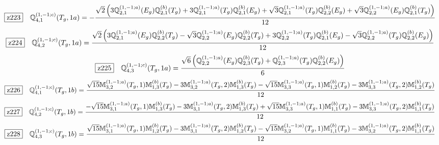 \documentclass[fleqn,10pt,landscape]{jsarticle}
\begin{document}
\begin{dmath*}
\hspace*{3mm}\fbox{z223}\quad \mathbb{Q}_{4,1}^{(1,-1;c)}(T_{g},1a)=- \frac{\sqrt{2} \left(3 \mathbb{Q}_{2,1}^{(1,-1;a)}(E_{g}) \mathbb{Q}_{2,1}^{(b)}(T_{g}) + 3 \mathbb{Q}_{2,1}^{(1,-1;a)}(T_{g}) \mathbb{Q}_{2,1}^{(b)}(E_{g}) + \sqrt{3} \mathbb{Q}_{2,1}^{(1,-1;a)}(T_{g}) \mathbb{Q}_{2,2}^{(b)}(E_{g}) + \sqrt{3} \mathbb{Q}_{2,2}^{(1,-1;a)}(E_{g}) \mathbb{Q}_{2,1}^{(b)}(T_{g})\right)}{12}
\end{dmath*}
\begin{dmath*}
\hspace*{3mm}\fbox{z224}\quad \mathbb{Q}_{4,2}^{(1,-1;c)}(T_{g},1a)=\frac{\sqrt{2} \left(3 \mathbb{Q}_{2,1}^{(1,-1;a)}(E_{g}) \mathbb{Q}_{2,2}^{(b)}(T_{g}) - \sqrt{3} \mathbb{Q}_{2,2}^{(1,-1;a)}(E_{g}) \mathbb{Q}_{2,2}^{(b)}(T_{g}) + 3 \mathbb{Q}_{2,2}^{(1,-1;a)}(T_{g}) \mathbb{Q}_{2,1}^{(b)}(E_{g}) - \sqrt{3} \mathbb{Q}_{2,2}^{(1,-1;a)}(T_{g}) \mathbb{Q}_{2,2}^{(b)}(E_{g})\right)}{12}
\end{dmath*}
\begin{dmath*}
\hspace*{3mm}\fbox{z225}\quad \mathbb{Q}_{4,3}^{(1,-1;c)}(T_{g},1a)=\frac{\sqrt{6} \left(\mathbb{Q}_{2,2}^{(1,-1;a)}(E_{g}) \mathbb{Q}_{2,3}^{(b)}(T_{g}) + \mathbb{Q}_{2,3}^{(1,-1;a)}(T_{g}) \mathbb{Q}_{2,2}^{(b)}(E_{g})\right)}{6}
\end{dmath*}
\begin{dmath*}
\hspace*{3mm}\fbox{z226}\quad \mathbb{Q}_{4,1}^{(1,-1;c)}(T_{g},1b)=\frac{\sqrt{15} \mathbb{M}_{3,2}^{(1,-1;a)}(T_{g},1) \mathbb{M}_{1,3}^{(b)}(T_{g}) - 3 \mathbb{M}_{3,2}^{(1,-1;a)}(T_{g},2) \mathbb{M}_{1,3}^{(b)}(T_{g}) - \sqrt{15} \mathbb{M}_{3,3}^{(1,-1;a)}(T_{g},1) \mathbb{M}_{1,2}^{(b)}(T_{g}) - 3 \mathbb{M}_{3,3}^{(1,-1;a)}(T_{g},2) \mathbb{M}_{1,2}^{(b)}(T_{g})}{12}
\end{dmath*}
\begin{dmath*}
\hspace*{3mm}\fbox{z227}\quad \mathbb{Q}_{4,2}^{(1,-1;c)}(T_{g},1b)=\frac{- \sqrt{15} \mathbb{M}_{3,1}^{(1,-1;a)}(T_{g},1) \mathbb{M}_{1,3}^{(b)}(T_{g}) - 3 \mathbb{M}_{3,1}^{(1,-1;a)}(T_{g},2) \mathbb{M}_{1,3}^{(b)}(T_{g}) + \sqrt{15} \mathbb{M}_{3,3}^{(1,-1;a)}(T_{g},1) \mathbb{M}_{1,1}^{(b)}(T_{g}) - 3 \mathbb{M}_{3,3}^{(1,-1;a)}(T_{g},2) \mathbb{M}_{1,1}^{(b)}(T_{g})}{12}
\end{dmath*}
\begin{dmath*}
\hspace*{3mm}\fbox{z228}\quad \mathbb{Q}_{4,3}^{(1,-1;c)}(T_{g},1b)=\frac{\sqrt{15} \mathbb{M}_{3,1}^{(1,-1;a)}(T_{g},1) \mathbb{M}_{1,2}^{(b)}(T_{g}) - 3 \mathbb{M}_{3,1}^{(1,-1;a)}(T_{g},2) \mathbb{M}_{1,2}^{(b)}(T_{g}) - \sqrt{15} \mathbb{M}_{3,2}^{(1,-1;a)}(T_{g},1) \mathbb{M}_{1,1}^{(b)}(T_{g}) - 3 \mathbb{M}_{3,2}^{(1,-1;a)}(T_{g},2) \mathbb{M}_{1,1}^{(b)}(T_{g})}{12}
\end{dmath*}
\end{document}
